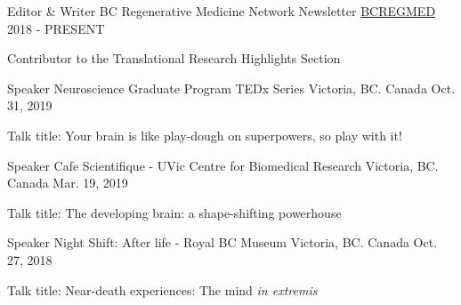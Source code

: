 

\begin{cventries}

  \cventry
    {Editor \& Writer} %
    {BC Regenerative Medicine Network Newsletter} %
    {\href{https://bcregmed.ca/news/past-bcregmed-newsletters/}{BCREGMED}} %
    {2018 - PRESENT} %
    {
      \begin{cvitems} %
        \item {Contributor to the Translational Research Highlights Section}
      \end{cvitems}
    }

  \cventry
    {Speaker} %
    {Neuroscience Graduate Program TEDx Series} %
    {Victoria, BC. Canada} %
    {Oct. 31, 2019} %
    {
      \begin{cvitems} %
        \item {Talk title: Your brain is like play-dough on superpowers, so play with it!}
      \end{cvitems}
    }
  \cventry
  {Speaker} %
  {Cafe Scientifique - UVic Centre for Biomedical Research} %
  {Victoria, BC. Canada} %
  {Mar. 19, 2019} %
  {
    \begin{cvitems} %
      \item {Talk title: The developing brain: a shape-shifting powerhouse}
    \end{cvitems}
  }
  \vspace{10pt}
  \cventry
  {Speaker} %
  {Night Shift: After life - Royal BC Museum} %
  {Victoria, BC. Canada} %
  {Oct. 27, 2018} %
  {
    \begin{cvitems} %
      \item {Talk title: Near-death experiences: The mind \textit{in extremis}}
    \end{cvitems}
}

\end{cventries}
